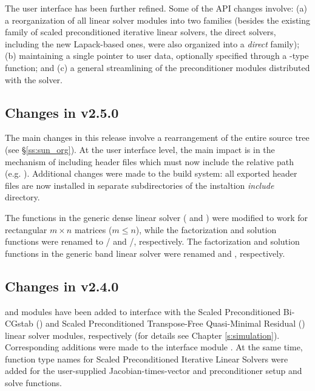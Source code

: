 The user interface has been further refined. Some of the API changes involve:
(a) a reorganization of all linear solver modules into two families (besides 
the existing family of scaled preconditioned iterative linear solvers,
the direct solvers, including the new Lapack-based ones, were also organized 
into a {\em direct} family); (b) maintaining a single pointer to user data,
optionally specified through a -type function; and (c) a general 
streamlining of the preconditioner modules distributed with the solver.

\subsection*{Changes in v2.5.0}

The main changes in this release involve a rearrangement of the entire 
{\sundials} source tree (see \S\ref{ss:sun_org}). At the user interface 
level, the main impact is in the mechanism of including {\sundials} header
files which must now include the relative path (e.g. ).
Additional changes were made to the build system: all exported header files are
now installed in separate subdirectories of the instaltion {\em include} directory.

The functions in the generic dense linear solver ( and
) were modified to work for rectangular $m \times n$
matrices ($m \le n$), while the factorization and solution functions were
renamed to / and /, 
respectively.
The factorization and solution functions in the generic band linear solver were 
renamed  and , respectively.

\subsection*{Changes in v2.4.0}

{\cvspbcg} and {\cvsptfqmr} modules have been added to interface with the
Scaled Preconditioned Bi-CGstab ({\spbcg}) and Scaled Preconditioned
Transpose-Free Quasi-Minimal Residual ({\sptfqmr}) linear solver modules,
respectively (for details see Chapter \ref{s:simulation}). Corresponding
additions were made to the {\F} interface module {\fcvode}.
At the same time, function type names for Scaled Preconditioned Iterative
Linear Solvers were added for the user-supplied Jacobian-times-vector and
preconditioner setup and solve functions.

